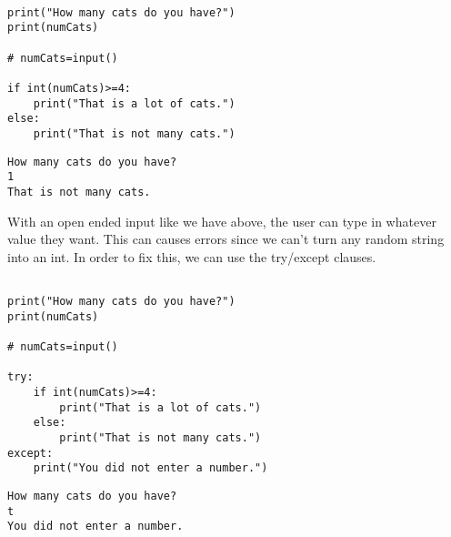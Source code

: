 \documentclass[11pt]{article}
\begin{document}
\begin{verbatim}

print("How many cats do you have?")
print(numCats)

# numCats=input()

if int(numCats)>=4:
    print("That is a lot of cats.")
else:
    print("That is not many cats.")

\end{verbatim}

\begin{verbatim}
How many cats do you have?
1
That is not many cats.
\end{verbatim}


With an open ended input like we have above, the user can type in whatever value they want. This can causes errors since we can't turn any random string into an int. In order to fix this, we can use the try/except clauses.


\begin{verbatim}

print("How many cats do you have?")
print(numCats)

# numCats=input()

try:
    if int(numCats)>=4:
        print("That is a lot of cats.")
    else:
        print("That is not many cats.")
except:
    print("You did not enter a number.")

\end{verbatim}

\begin{verbatim}
How many cats do you have?
t
You did not enter a number.
\end{verbatim}
\end{document}
